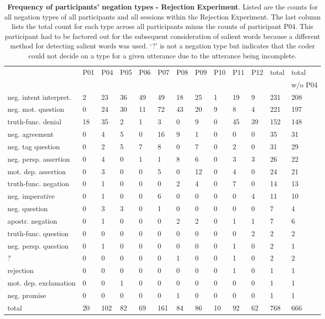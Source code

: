 \begin{screenonly}
\begin{table*}[h]
  \caption{\textbf{Frequency of participants' negation types - Rejection Experiment}. Listed are the counts for all
    negation types of all participants and all sessions within the Rejection Experiment. The last column
    lists the total count for each type across all participants minus the counts of participant P04. This participant
    had to be factored out for the subsequent consideration of salient words because a different method for detecting salient
    words was used. `?' is not a negation type but indicates that the coder could not decide on a type for a given
    utterance due to the utterance being incomplete.}
  \label{tbl_freq_neg_types_re}
\begin{tabular*}{\hsize}{@{\extracolsep{\fill}}lllllllllllll}
    \toprule
    & P01 & P04 & P05 & P06 & P07 & P08 & P09 & P10 & P11 & P12 & total & total\\
    & & & & & & & & & & & & w/o P04\\
    \midrule
    neg. intent interpret. & 2 & 23 & 36 & 49 & 49 & 18 & 25 & 1 & 19 & 9 & 231 & 208\\
    neg. mot. question & 0 & 24 & 30 & 11 & 72 & 43 & 20 & 9 & 8 & 4 & 221 & 197\\
    truth-func. denial & 18 & 35 & 2 & 1 & 3 & 0 & 9 & 0 & 45 & 39 & 152 & 148\\
    neg. agreement & 0 & 4 & 5 & 0 & 16 & 9 & 1 & 0 & 0 & 0 & 35 & 31\\
    neg. tag question & 0 & 2 & 5 & 7 & 8 & 0 & 7 & 0 & 2 & 0 & 31 & 29\\
    neg. persp. assertion & 0 & 4 & 0 & 1 & 1 & 8 & 6 & 0 & 3 & 3 & 26 & 22\\
    mot. dep. assertion & 0 & 3 & 0 & 0 & 5 & 0 & 12 & 0 & 4 & 0 & 24 & 21\\
    truth-func. negation & 0 & 1 & 0 & 0 & 0 & 2 & 4 & 0 & 7 & 0 & 14 & 13\\
    neg. imperative & 0 & 1 & 0 & 0 & 6 & 0 & 0 & 0 & 0 & 4 & 11 & 10\\
    neg. question & 0 & 3 & 3 & 0 & 1 & 0 & 0 & 0 & 0 & 0 & 7 & 4\\
    apostr. negation & 0 & 1 & 0 & 0 & 0 & 2 & 2 & 0 & 1 & 1 & 7 & 6\\
    truth-func. question & 0 & 0 & 0 & 0 & 0 & 0 & 0 & 0 & 0 & 2 & 2 & 2\\
    neg. persp. question & 0 & 1 & 0 & 0 & 0 & 0 & 0 & 0 & 1 & 0 & 2 & 1\\
    ? & 0 & 0 & 0 & 0 & 0 & 1 & 0 & 0 & 1 & 0 & 2 & 2\\
    rejection & 0 & 0 & 0 & 0 & 0 & 0 & 0 & 0 & 1 & 0 & 1 & 1\\
    mot. dep. exclamation & 0 & 0 & 1 & 0 & 0 & 0 & 0 & 0 & 0 & 0 & 1 & 1\\
    neg. promise & 0 & 0 & 0 & 0 & 0 & 1 & 0 & 0 & 0 & 0 & 1 & 1\\
    \midrule
    total & 20 & 102 & 82 & 69 & 161 & 84 & 86 & 10 & 92 & 62 & 768 & 666\\
    \bottomrule
  \end{tabular*}
\end{table*}


\end{screenonly}
